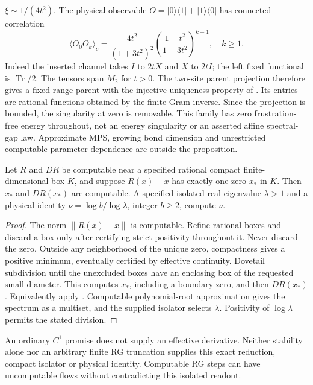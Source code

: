 $\xi\sim1/(4t^2)$. The physical observable
$O=|0\rangle\langle1|+|1\rangle\langle0|$ has connected correlation
\[
 \langle O_0O_k\rangle_c=
 \frac{4t^2}{(1+3t^2)^2}
 \left(\frac{1-t^2}{1+3t^2}\right)^{k-1},\quad k\geq1.
\]
Indeed the inserted channel takes $I$ to $2tX$ and $X$ to $2tI$;
the left fixed functional is $\operatorname{Tr}/2$.
The tensors span $M_2$ for $t>0$. The two-site parent projection
therefore gives a fixed-range parent with the injective uniqueness
property of \cite[Section~4.1.2]{matrixProductStates}. Its entries
are rational functions obtained by the finite Gram inverse. Since
the projection is bounded, the singularity at zero is removable.
This family has zero frustration-free energy throughout, not an
energy singularity or an asserted affine spectral-gap law.
Approximate MPS, growing bond dimension and unrestricted computable
parameter dependence are outside the proposition.

\begin{proposition}\label{prop:rg-certificate}
Let $R$ and $DR$ be computable near a specified rational compact
finite-dimensional box $K$, and suppose $R(x)-x$ has exactly one
zero $x_*$ in $K$. Then $x_*$ and $DR(x_*)$ are computable. A
specified isolated real eigenvalue $\lambda>1$ and a physical
identity $\nu=\log b/\log\lambda$, integer $b\geq2$, compute $\nu$.
\end{proposition}
\begin{proof}
The norm $\|R(x)-x\|$ is computable. Refine rational boxes and
discard a box only after certifying strict positivity throughout it.
Never discard the zero. Outside any neighborhood of the unique zero,
compactness gives a positive minimum, eventually certified by
effective continuity. Dovetail subdivision until the unexcluded
boxes have an enclosing box of the requested small diameter. This
computes $x_*$, including a boundary zero, and then $DR(x_*)$.
Equivalently apply \cite[Theorem~2.9]{invariantComputability}.
Computable polynomial-root approximation gives the spectrum as a
multiset, and the supplied isolator selects $\lambda$. Positivity
of $\log\lambda$ permits the stated division.
\end{proof}
An ordinary $C^1$ promise does not supply an effective derivative.
Neither stability alone nor an arbitrary finite RG truncation
supplies this exact reduction, compact isolator or physical identity.
Computable RG steps can have uncomputable flows
\cite{renormalisation} without contradicting this isolated readout.

